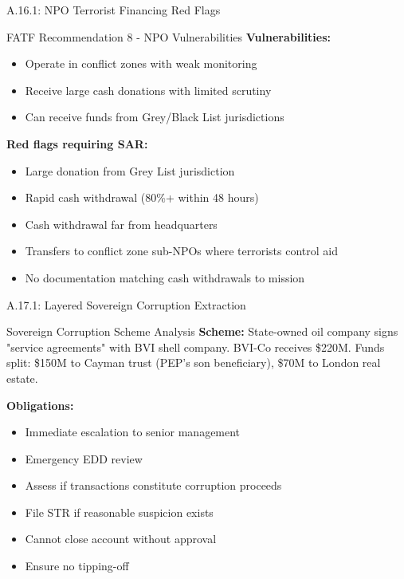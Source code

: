 \documentclass{beamer}
\begin{document}
	\begin{frame}{A.16.1: NPO Terrorist Financing Red Flags}
		\begin{block}{FATF Recommendation 8 - NPO Vulnerabilities}
			\textbf{Vulnerabilities:}
			\begin{itemize}
				\item Operate in conflict zones with weak monitoring
				\item Receive large cash donations with limited scrutiny
				\item Can receive funds from Grey/Black List jurisdictions
			\end{itemize}
			\textbf{Red flags requiring SAR:}
			\begin{itemize}
				\item Large donation from Grey List jurisdiction
				\item Rapid cash withdrawal (80\%+ within 48 hours)
				\item Cash withdrawal far from headquarters
				\item Transfers to conflict zone sub-NPOs where terrorists control aid
				\item No documentation matching cash withdrawals to mission
			\end{itemize}
		\end{block}
	\end{frame}
	

\begin{frame}{A.17.1: Layered Sovereign Corruption Extraction}
	\begin{block}{Sovereign Corruption Scheme Analysis}
		\textbf{Scheme:} State-owned oil company signs "service agreements" with BVI shell company. BVI-Co receives \$220M. Funds split: \$150M to Cayman trust (PEP's son beneficiary), \$70M to London real estate.
	\end{block}
	\textbf{Obligations:}
	\begin{itemize}
		\item Immediate escalation to senior management
		\item Emergency EDD review
		\item Assess if transactions constitute corruption proceeds
		\item File STR if reasonable suspicion exists
		\item Cannot close account without approval
		\item Ensure no tipping-off
	\end{itemize}
\end{frame}
\end{document}
